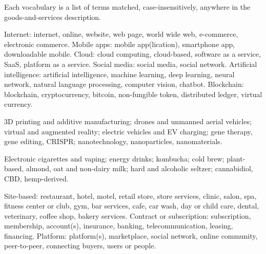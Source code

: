 Each vocabulary is a list of terms matched, case-insensitively, anywhere
in the goods-and-services description.
\begin{description}\small
\item[General-purpose technologies.] Internet: internet, online,
website, web page, world wide web, e-commerce, electronic commerce.
Mobile apps: mobile app(lication), smartphone app, downloadable mobile.
Cloud: cloud computing, cloud-based, software as a service, SaaS,
platform as a service. Social media: social media, social network.
Artificial intelligence: artificial intelligence, machine learning, deep
learning, neural network, natural language processing, computer vision,
chatbot. Blockchain: blockchain, cryptocurrency, bitcoin, non-fungible
token, distributed ledger, virtual currency.
\item[Inventions.] 3D printing and additive manufacturing; drones and
unmanned aerial vehicles; virtual and augmented reality; electric
vehicles and EV charging; gene therapy, gene editing, CRISPR;
nanotechnology, nanoparticles, nanomaterials.
\item[Emergent consumer categories.] Electronic cigarettes and vaping;
energy drinks; kombucha; cold brew; plant-based, almond, oat and
non-dairy milk; hard and alcoholic seltzer; cannabidiol, CBD,
hemp-derived.
\item[Kinds of business.] Site-based: restaurant, hotel, motel, retail
store, store services, clinic, salon, spa, fitness center or club, gym,
bar services, cafe, car wash, day or child care, dental, veterinary,
coffee shop, bakery services. Contract or subscription: subscription,
membership, account(s), insurance, banking, telecommunication, leasing,
financing. Platform: platform(s), marketplace, social network, online
community, peer-to-peer, connecting buyers, users or people.
\end{description}



